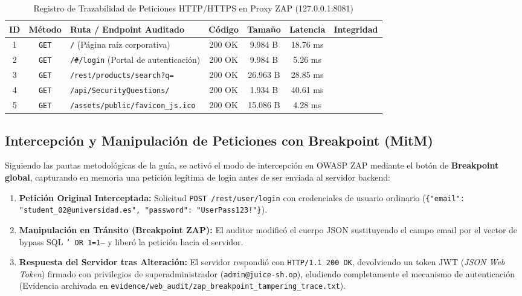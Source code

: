 \documentclass[11pt,a4paper]{article}
\begin{document}
\begin{table}[h!]
\centering
\small
\caption{Registro de Trazabilidad de Peticiones HTTP/HTTPS en Proxy ZAP (127.0.0.1:8081)}
\label{tab:zap_traceability}
\begin{tabularx}{\textwidth}{ccXcccl}
\toprule
\textbf{ID} & \textbf{Método} & \textbf{Ruta / Endpoint Auditado} & \textbf{Código} & \textbf{Tamaño} & \textbf{Latencia} & \textbf{Integridad} \\
\midrule
1 & \texttt{GET} & \texttt{/} (Página raíz corporativa) & 200 OK & 9.984 B & 18.76 ms & \textbf{\color{accentgreen}{VERIFICADO}} \\
2 & \texttt{GET} & \texttt{/\#/login} (Portal de autenticación) & 200 OK & 9.984 B & 5.26 ms & \textbf{\color{accentgreen}{VERIFICADO}} \\
3 & \texttt{GET} & \texttt{/rest/products/search?q=} & 200 OK & 26.963 B & 28.85 ms & \textbf{\color{accentgreen}{VERIFICADO}} \\
4 & \texttt{GET} & \texttt{/api/SecurityQuestions/} & 200 OK & 1.934 B & 40.61 ms & \textbf{\color{accentgreen}{VERIFICADO}} \\
5 & \texttt{GET} & \texttt{/assets/public/favicon\_js.ico} & 200 OK & 15.086 B & 4.28 ms & \textbf{\color{accentgreen}{VERIFICADO}} \\
\bottomrule
\end{tabularx}
\end{table}

\subsection{Intercepción y Manipulación de Peticiones con Breakpoint (MitM)}
Siguiendo las pautas metodológicas de la guía, se activó el modo de intercepción en OWASP ZAP mediante el botón de \textbf{Breakpoint global}, capturando en memoria una petición legítima de login antes de ser enviada al servidor backend:
\begin{enumerate}[noitemsep]
    \item \textbf{Petición Original Interceptada:} Solicitud \texttt{POST /rest/user/login} con credenciales de usuario ordinario (\texttt{\{"email": "student\_02@universidad.es", "password": "UserPass123!"\}}).
    \item \textbf{Manipulación en Tránsito (Breakpoint ZAP):} El auditor modificó el cuerpo JSON sustituyendo el campo email por el vector de bypass SQL \texttt{' OR 1=1--} y liberó la petición hacia el servidor.
    \item \textbf{Respuesta del Servidor tras Alteración:} El servidor respondió con \texttt{HTTP/1.1 200 OK}, devolviendo un token JWT (\textit{JSON Web Token}) firmado con privilegios de superadministrador (\texttt{admin@juice-sh.op}), eludiendo completamente el mecanismo de autenticación (Evidencia archivada en \texttt{evidence/web\_audit/zap\_breakpoint\_tampering\_trace.txt}).
\end{enumerate}
\end{document}
